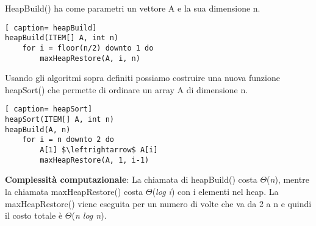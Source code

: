 \documentclass[../cheatSheetAlgoritmi.tex]{subfiles}
\begin{document}
HeapBuild() ha come parametri un vettore A e la sua dimensione n. 
\begin{lstlisting}[ caption= heapBuild]
heapBuild(ITEM[] A, int n)
	for i = floor(n/2) downto 1 do
		maxHeapRestore(A, i, n)
\end{lstlisting}
Usando gli algoritmi sopra definiti possiamo costruire una nuova funzione heapSort() che permette di ordinare un array A di dimensione n. 
\begin{lstlisting}[ caption= heapSort]
heapSort(ITEM[] A, int n)
heapBuild(A, n)
	for i = n downto 2 do
		A[1] $\leftrightarrow$ A[i]
		maxHeapRestore(A, 1, i-1)
\end{lstlisting}
\textbf{Complessità computazionale}: La chiamata di heapBuild() costa $\Theta$(\textit{n}), mentre la chiamata maxHeapRestore() costa $\Theta$(\textit{log i}) con i elementi nel heap. La maxHeapRestore() viene eseguita per un numero di volte che va da 2 a n e quindi il costo totale è $\Theta$(\textit{n log n}).
\end{document}
